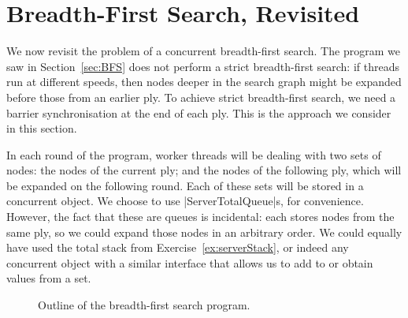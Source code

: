 \section{Breadth-First Search, Revisited}
\label{sec:sync-BFS}

We now revisit the problem of a concurrent breadth-first search.  The program
we saw in Section~\ref{sec:BFS} does not perform a strict breadth-first
search: if threads run at different speeds, then nodes deeper in the search
graph might be expanded before those from an earlier ply.  To achieve strict
breadth-first search, we need a barrier synchronisation at the end of each
ply.  This is the approach we consider in this section.

In each round of the program, worker threads will be dealing with two sets of
nodes: the nodes of the current ply; and the nodes of the following ply, which
will be expanded on the following round.  Each of these sets will be stored in
a concurrent object.  We choose to use |ServerTotalQueue|s, for convenience.
However, the fact that these are queues is incidental: each stores nodes from
the same ply, so we could expand those nodes in an arbitrary order.  We could
equally have used the total stack from Exercise~\ref{ex:serverStack}, or
indeed any concurrent object with a similar interface that allows us to add to
or obtain values from a set.


\begin{figure}
\caption{Outline of the breadth-first search program.}
\label{fig:sync-BFS}
\end{figure}


